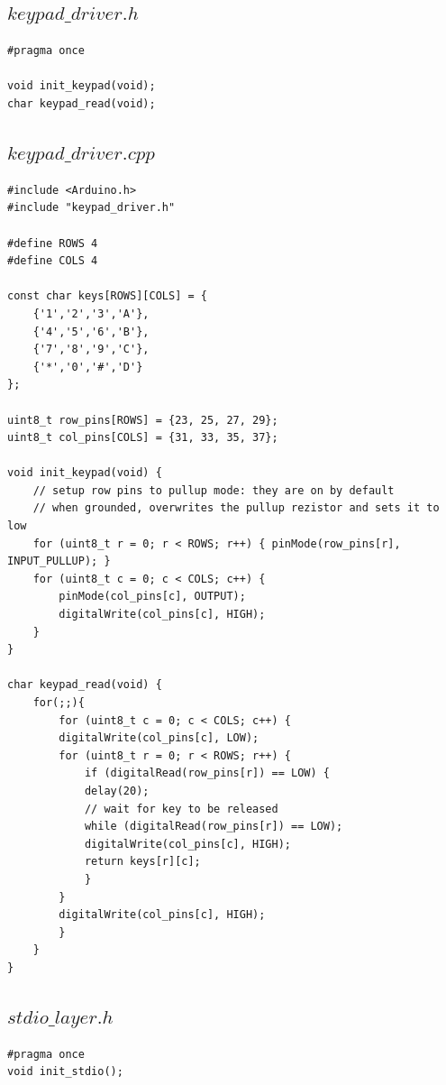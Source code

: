\documentclass[10pt,a4paper]{report}
\begin{document}
\newpage
\subsection*{$keypad\_driver.h$}
\begin{lstlisting}
#pragma once

void init_keypad(void);
char keypad_read(void);
\end{lstlisting}

\subsection*{$keypad\_driver.cpp$}
\begin{lstlisting}
#include <Arduino.h>
#include "keypad_driver.h"

#define ROWS 4
#define COLS 4

const char keys[ROWS][COLS] = {
    {'1','2','3','A'},
    {'4','5','6','B'},
    {'7','8','9','C'},
    {'*','0','#','D'}
};

uint8_t row_pins[ROWS] = {23, 25, 27, 29};
uint8_t col_pins[COLS] = {31, 33, 35, 37};

void init_keypad(void) {
    // setup row pins to pullup mode: they are on by default
    // when grounded, overwrites the pullup rezistor and sets it to low
    for (uint8_t r = 0; r < ROWS; r++) { pinMode(row_pins[r], INPUT_PULLUP); }
    for (uint8_t c = 0; c < COLS; c++) {
        pinMode(col_pins[c], OUTPUT);
        digitalWrite(col_pins[c], HIGH);
    }
}

char keypad_read(void) {
	for(;;){
	    for (uint8_t c = 0; c < COLS; c++) {
		digitalWrite(col_pins[c], LOW);
		for (uint8_t r = 0; r < ROWS; r++) {
		    if (digitalRead(row_pins[r]) == LOW) {
			delay(20);
			// wait for key to be released
			while (digitalRead(row_pins[r]) == LOW);
			digitalWrite(col_pins[c], HIGH);
			return keys[r][c];
		    }
		}
		digitalWrite(col_pins[c], HIGH);
	    }
	}
}
\end{lstlisting}

\subsection*{$stdio\_layer.h$}
\begin{lstlisting}
#pragma once
void init_stdio();
\end{lstlisting}
\end{document}
